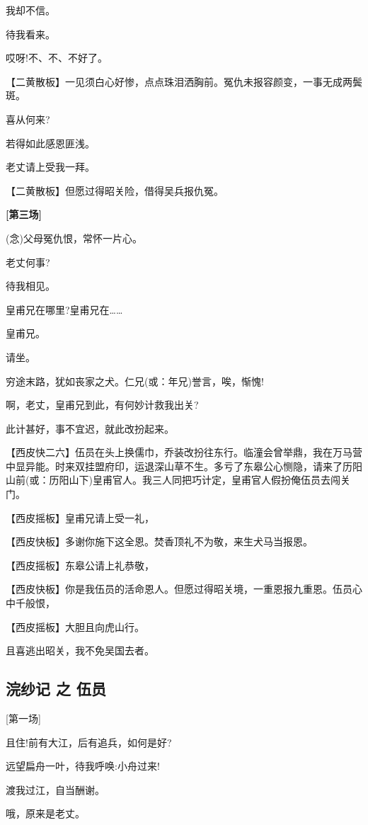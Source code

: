 我却不信。

待我看来。

哎呀!不、不、不好了。

【二黄散板】一见须白心好惨，点点珠泪洒胸前。冤仇未报容颜变，一事无成两鬓斑。

喜从何来?

若得如此感恩匪浅。

老丈请上受我一拜。

【二黄散板】但愿过得昭关险，借得吴兵报仇冤。

\textbf{{[}第三场{]}}

(念)父母冤仇恨，常怀一片心。

老丈何事?

待我相见。

皇甫兄在哪里?皇甫兄在\ldots{}\ldots{}

皇甫兄。

请坐。

穷途末路，犹如丧家之犬。仁兄(或：年兄)誉言，唉，惭愧!

啊，老丈，皇甫兄到此，有何妙计救我出关?

此计甚好，事不宜迟，就此改扮起来。

【西皮快二六】伍员在头上换儒巾，乔装改扮往东行。临潼会曾举鼎，我在万马营中显异能。时来双挂盟府印，运退深山草不生。多亏了东皋公心恻隐，请来了历阳山前(或：历阳山下)皇甫官人。我三人同把巧计定，皇甫官人假扮俺伍员去闯关门。

【西皮摇板】皇甫兄请上受一礼，

【西皮快板】多谢你施下这全恩。焚香顶礼不为敬，来生犬马当报恩。

【西皮摇板】东皋公请上礼恭敬，

【西皮快板】你是我伍员的活命恩人。但愿过得昭关境，一重恩报九重恩。伍员心中千般恨，

【西皮摇板】大胆且向虎山行。

且喜逃出昭关，我不免吴国去者。

\hypertarget{ux6d63ux7eb1ux8bb0-ux4e4b-ux4f0dux5458}{%
\subsection{浣纱记 之
伍员}\label{ux6d63ux7eb1ux8bb0-ux4e4b-ux4f0dux5458}}

{[}第一场{]}

且住!前有大江，后有追兵，如何是好?

远望扁舟一叶，待我呼唤:小舟过来!

渡我过江，自当酬谢。

哦，原来是老丈。

